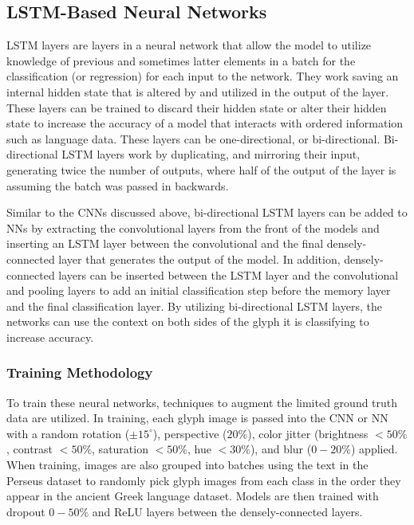 \subsection{LSTM-Based Neural Networks}

LSTM layers are layers in a neural network that allow the model to utilize knowledge of previous and sometimes latter elements in a batch for the classification (or regression) for each input to the network. They work saving an internal hidden state that is altered by and utilized in the output of the layer. These layers can be trained to discard their hidden state or alter their hidden state to increase the accuracy of a model that interacts with ordered information such as language data. These layers can be one-directional, or bi-directional. Bi-directional LSTM layers work by duplicating, and mirroring their input, generating twice the number of outputs, where half of the output of the layer is assuming the batch was passed in backwards.

Similar to the CNNs discussed above, bi-directional LSTM layers can be added to NNs by extracting the convolutional layers from the front of the models and inserting an LSTM layer between the convolutional and the final densely-connected layer that generates the output of the model. In addition, densely-connected layers can be inserted between the LSTM layer and the convolutional and pooling layers to add an initial classification step before the memory layer and the final classification layer. By utilizing bi-directional LSTM layers, the networks can use the context on both sides of the glyph it is classifying to increase accuracy.

\subsubsection{Training Methodology}

To train these neural networks, techniques to augment the limited ground truth data are utilized. In training, each glyph image is passed into the CNN or NN with a random rotation ($\pm 15^\circ$), perspective ($20\%$), color jitter (brightness $<50\%$, contrast $<50\%$, saturation $<50\%$, hue $<30\%$), and blur ($0-20\%$) applied. When training, images are also grouped into batches using the text in the Perseus dataset to randomly pick glyph images from each class in the order they appear in the ancient Greek language dataset. Models are then trained with dropout $0-50\%$ and ReLU layers between the densely-connected layers.

